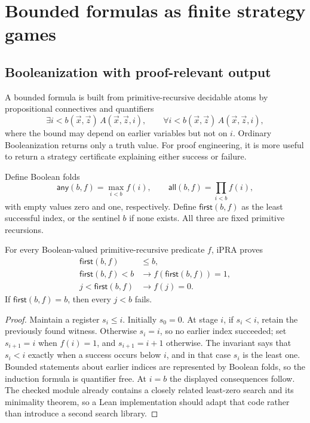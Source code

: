 \section{Bounded formulas as finite strategy games}\label{sec:games}

\subsection{Booleanization with proof-relevant output}

A bounded formula is built from primitive-recursive decidable atoms by propositional connectives and quantifiers
\[
  \exists i<b(\vec x,\vec z)\,A(\vec x,\vec z,i),\qquad
  \forall i<b(\vec x,\vec z)\,A(\vec x,\vec z,i),
\]
where the bound may depend on earlier variables but not on \(i\).  Ordinary Booleanization returns only a truth value.  For proof engineering, it is more useful to return a strategy certificate explaining either success or failure.

Define Boolean folds
\[
 \mathsf{any}(b,f)=\max_{i<b} f(i),\qquad
 \mathsf{all}(b,f)=\prod_{i<b} f(i),
\]
with empty values zero and one, respectively.  Define \(\mathsf{first}(b,f)\) as the least successful index, or the sentinel \(b\) if none exists.  All three are fixed primitive recursions.

\begin{lemma}\label{lem:first}
For every Boolean-valued primitive-recursive predicate \(f\), iPRA proves
\begin{align*}
  \mathsf{first}(b,f)&\leq b,\\
  \mathsf{first}(b,f)<b&\longrightarrow f(\mathsf{first}(b,f))=1,\\
  j<\mathsf{first}(b,f)&\longrightarrow f(j)=0.
\end{align*}
If \(\mathsf{first}(b,f)=b\), then every \(j<b\) fails.
\end{lemma}

\begin{proof}
Maintain a register \(s_i\leq i\).  Initially \(s_0=0\).  At stage \(i\), if \(s_i<i\), retain the previously found witness.  Otherwise \(s_i=i\), so no earlier index succeeded; set \(s_{i+1}=i\) when \(f(i)=1\), and \(s_{i+1}=i+1\) otherwise.  The invariant says that \(s_i<i\) exactly when a success occurs below \(i\), and in that case \(s_i\) is the least one.  Bounded statements about earlier indices are represented by Boolean folds, so the induction formula is quantifier free.  At \(i=b\) the displayed consequences follow.  The checked  module already contains a closely related least-zero search and its minimality theorem, so a Lean implementation should adapt that code rather than introduce a second search library.
\end{proof}

